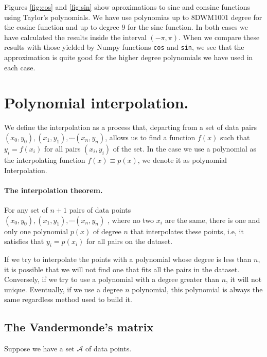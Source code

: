 \begin{paracol}{2}
\switchcolumn
Figures \ref{fig:cos} and \ref{fig:sin} show aproximations to sine and consine functions using Taylor's polynomials. We have use polynomias up to 8DWM1001 degree for the cosine function and up to degree 9 for the sine function. In both cases we have calculated the results inside the interval $(-\pi, \pi)$. When we compare these results with those yielded by Numpy functions \texttt{cos} and \texttt{sin}, we see that the approximation is quite good for the higher degree  polynomials we have used in each case.

\section{Polynomial interpolati\-on.}
We define the interpolation as a process that, departing from a set of data pairs \\ $(x_0,y_0),(x_1,y_1), \cdots (x_n,y_n)$, allows us to find a function $f(x)$ such that $y_i = f(x_i)$ for all pairs $(x_i,y_i)$ of the set. In the case we use a polynomial as the interpolating function $f(x)\equiv p(x)$, we denote it as polynomial Interpolation. 

\paragraph{The interpolation theorem.}
For any set of $n+1$ pairs of data points\\ $(x_0,y_0) ,(x_1,y_1),\cdots (x_n,y_n)$ , where no two $x_i$ are the same, there is one and only one polynomial $p(x)$ of degree $n$ that interpolates these points, i.e, it satisfies that $y_i=p(x_i)$ for all pairs on the dataset.

If we try to interpolate the points with a polynomial whose degree is less than $n$, it is possible that we will not find one that fits all the pairs in the dataset. Conversely, if we try to use a polynomial with a degree greater than $n$, it will not unique. Eventually, if we use a degree $n$ polynomial, this polynomial is always the same regardless method used to build it.        

\subsection{The Vandermonde's matrix}
Suppose we have a set $\mathcal{A}$ of data points.
\end{paracol}

